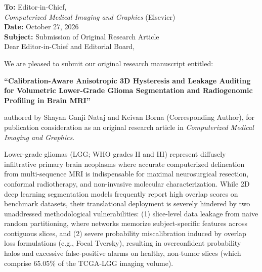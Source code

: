 \documentclass[11pt]{article}
\begin{document}
\thispagestyle{empty}

\noindent
\textbf{To:} Editor-in-Chief,\\
\textit{Computerized Medical Imaging and Graphics} (Elsevier)\\

\vspace{0.6em}
\noindent
\textbf{Date:} October 27, 2026\\
\textbf{Subject:} Submission of Original Research Article\\

\vspace{0.8em}
\noindent
Dear Editor-in-Chief and Editorial Board,

\vspace{0.6em}
We are pleased to submit our original research manuscript entitled:

\begin{center}
\textbf{``Calibration-Aware Anisotropic 3D Hysteresis and Leakage Auditing for Volumetric Lower-Grade Glioma Segmentation and Radiogenomic Profiling in Brain MRI''}
\end{center}

\noindent
authored by Shayan Ganji Nataj and Keivan Borna (Corresponding Author), for publication consideration as an original research article in \textit{Computerized Medical Imaging and Graphics}.

\vspace{0.6em}
Lower-grade gliomas (LGG; WHO grades II and III) represent diffusely infiltrative primary brain neoplasms where accurate computerized delineation from multi-sequence MRI is indispensable for maximal neurosurgical resection, conformal radiotherapy, and non-invasive molecular characterization. While 2D deep learning segmentation models frequently report high overlap scores on benchmark datasets, their translational deployment is severely hindered by two unaddressed methodological vulnerabilities: (1) slice-level data leakage from naive random partitioning, where networks memorize subject-specific features across contiguous slices, and (2) severe probability miscalibration induced by overlap loss formulations (e.g., Focal Tversky), resulting in overconfident probability halos and excessive false-positive alarms on healthy, non-tumor slices (which comprise 65.05\% of the TCGA-LGG imaging volume).
\end{document}
